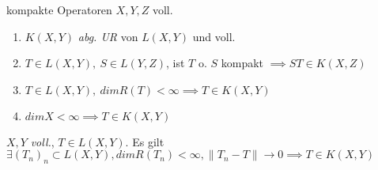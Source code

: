 \begin{satz}{kompakte Operatoren}
  $X,Y,Z$ voll.
  \begin{enumerate}[label=(\roman*)]
    \item $K(X,Y)$ \textit{abg. UR} von $L(X,Y)$ und voll.
    \item $T\in L(X,Y),\ S\in L(Y,Z)$, ist $T \text{ o. } S$ kompakt
      $\implies ST \in K(X,Z)$
    \item $T \in L(X,Y),\ dimR(T) < \infty \implies T \in K(X,Y)$
    \item $dimX < \infty \implies T \in K(X,Y)$
  \end{enumerate}
\end{satz}

\begin{korrolar}
  $X,Y$ \textit{voll.}, $T \in L(X,Y)$. Es gilt
  $\exists (T_n)_n \subset L(X,Y), dimR(T_n)<\infty, \|T_n-T\| \to 0
  \implies T \in K(X,Y)$
\end{korrolar}
